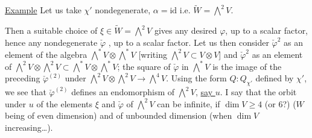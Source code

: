 
\uline{Example} Let us take $\chi'$ nondegenerate,  $\alpha=\mathrm{id}$ i.e. $\widetilde W=\bigwedge^2V$.

Then a suitable choice of $\xi\in\widetilde W=\bigwedge^2V$ gives any desired $\varphi$, up to a scalar factor, hence any nondegenerate $\check\varphi$ , up to a scalar factor. Let us then consider $\check\varphi^2$ as an element of  the algebra $\bigwedge^*V\otimes\bigwedge^*V$ [writing $\bigwedge^2V\subset V\otimes V$] and $\check\varphi^2$ as an element of $\bigwedge^2V\otimes\bigwedge^2V\subset\bigwedge^*V\otimes\bigwedge^*V$; the square of $\check\varphi$ in $\bigwedge^*V$  is the image of the preceding $\check\varphi^{(2)}$ under $\bigwedge^2V\otimes\bigwedge^2V\longrightarrow\bigwedge^4V$. Using the form $Q:Q_{\chi'}$ defined by $\chi'$, we see that $\check\varphi^{(2)}$ defines an endomorphism of $\bigwedge^2V$, \uline{say $u$}. I say that the orbit under $u$ of the elements $\xi$ and $\check\varphi$ of $\bigwedge^2V$ can be infinite, if $\dim V\geq4$ (or $6$?) ($W$ being of even dimension) and   of unbounded dimension (when $\dim V$ increasing\ldots).
\deleted{$\unsure{\xi}$}
